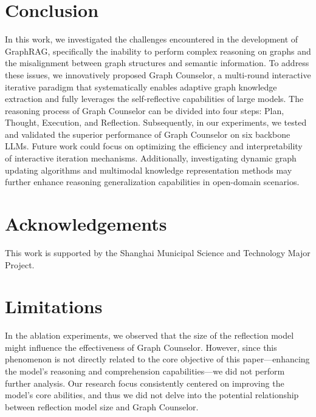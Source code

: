 \documentclass[11pt]{article}
\begin{document}
\section{Conclusion}
In this work, we investigated the challenges encountered in the development of GraphRAG, specifically the inability to perform complex reasoning on graphs and the misalignment between graph structures and semantic information. To address these issues, we innovatively proposed Graph Counselor, a multi-round interactive iterative paradigm that systematically enables adaptive graph knowledge extraction and fully leverages the self-reflective capabilities of large models. The reasoning process of Graph Counselor can be divided into four steps: Plan, Thought, Execution, and Reflection. Subsequently, in our experiments, we tested and validated the superior performance of Graph Counselor on six backbone LLMs. Future work could focus on optimizing the efficiency and interpretability of interactive iteration mechanisms. Additionally, investigating dynamic graph updating algorithms and multimodal knowledge representation methods may further enhance reasoning generalization capabilities in open-domain scenarios.

\section*{Acknowledgements}
This work is supported by the Shanghai Municipal Science and Technology Major Project.

\section*{Limitations}
In the ablation experiments, we observed that the size of the reflection model might influence the effectiveness of Graph Counselor. However, since this phenomenon is not directly related to the core objective of this paper—enhancing the model's reasoning and comprehension capabilities—we did not perform further analysis. Our research focus consistently centered on improving the model's core abilities, and thus we did not delve into the potential relationship between reflection model size and Graph Counselor.



\newpage
\mbox{}
\newpage

\appendix


\onecolumn
\end{document}
